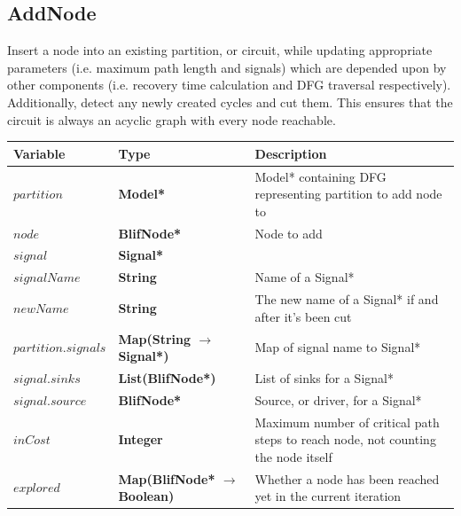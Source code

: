 \documentclass[12pt,final,oneside]{dwThesis} %
\begin{document}
   \subsection{AddNode}
   Insert a node into an existing partition, or
   circuit, while updating appropriate parameters (i.e. maximum path length and
   signals) which are depended upon by other components (i.e. recovery time
   calculation and \gls{DFG} traversal respectively).  Additionally, detect any
   newly created cycles and cut them.  This ensures that the circuit is always
   an acyclic graph with every node reachable.  
   \begin{algorithm}


      \begin{center}

         \begin{tabularx}
            {\linewidth}{llX} \toprule Variable & Type
            & Description\\
            \midrule $partition$ &\textbf{  Model* } &  Model*
            containing DFG representing partition to add node to\\
            $node$
            &\textbf{  BlifNode* } &  Node to add\\
            $signal$ &\textbf{  Signal*
            } &  \\
            $signalName$ &\textbf{ String } &  Name of a Signal*\\

            $newName$ &\textbf{ String } &  The new name of a Signal* if and
            after it's been cut\\
            $partition.signals$ &\textbf{  Map(String
               $\to$ Signal*) } &  Map of signal name to Signal* \\

            $signal.sinks$ &\textbf{  List(BlifNode*) } &  List of sinks for a
            Signal* \\
            $signal.source$ &\textbf{  BlifNode* } &  Source, or
            driver, for a Signal* \\
            $inCost$ &\textbf{ Integer } &  Maximum
            number of critical path steps to reach node, not counting the node
            itself \\
            $explored$ &\textbf{  Map(BlifNode* $\to$ Boolean) } &
            Whether a node has been reached yet in the current iteration \\

            \bottomrule 
         \end{tabularx}


\end{center}
\end{algorithm}
\end{document}
